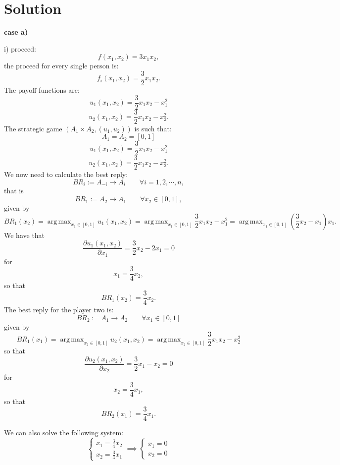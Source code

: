 \documentclass[a4paper, twoside, openany]{book}
\DeclareMathOperator*{\argmax}{arg\,max}
\begin{document}
\section*{Solution}
\textbf{case a)} \par
i) proceed:
$$f(x_1, x_2) = 3x_1 x_2,$$
the proceed for every single person is:
$$f_i(x_1, x_2) = \frac{3}{2} x_1 x_2.$$
The payoff functions are:
$$u_1(x_1, x_2) = \frac{3}{2}x_1 x_2 - x_1^2$$
$$u_2(x_1, x_2) = \frac{3}{2}x_1 x_2 - x_2^2.$$
The strategic game $(A_1 \times A_2, (u_1, u_2))$ is such that:
$$A_1 = A_2 = [0, 1]$$
$$u_1(x_1, x_2) = \frac{3}{2}x_1 x_2 - x_1^2$$
$$u_2(x_1, x_2) = \frac{3}{2}x_1 x_2 - x_2^2.$$
We now need to calculate the best reply:
$$BR_i:= A_{-i} \rightarrow A_i \qquad \forall i = 1, 2, \cdots, n,$$
that is
$$BR_1:= A_2 \rightarrow A_1 \qquad \forall x_2 \in [0, 1],$$
given by
$$BR_1(x_2) = \argmax_{x_1 \in [0,1]} u_1(x_1, x_2) = \argmax_{x_1 \in [0,1]} \frac{3}{2} x_1 x_2 - x_1^2 = \argmax_{x_1 \in [0, 1]} (\frac{3}{2}x_2 - x_1)x_1.$$
We have that
$$\frac{\partial u_1(x_1, x_2)}{\partial x_1} = \frac{3}{2}x_2 - 2 x_1 = 0$$
for
$$x_1 = \frac{3}{4}x_2,$$
so that
$$BR_1(x_2) = \frac{3}{4}x_2.$$
The best reply for the player two is:
$$BR_2:= A_1 \rightarrow A_2 \qquad \forall x_1 \in [0, 1]$$
given by
$$BR_1(x_1) = \argmax_{x_2 \in [0, 1]} u_2(x_1, x_2) = \argmax_{x_2 \in [0, 1]} \frac{3}{2}x_1 x_2 - x_2^2$$
so that
$$\frac{\partial u_2(x_1, x_2)}{\partial x_2} = \frac{3}{2}x_1 - x_2 = 0$$
for
$$x_2 = \frac{3}{4} x_1,$$
so that
$$BR_2(x_1) = \frac{3}{4}x_1.$$
\begin{figure}[!ht]
\begin{center}
\end{center}
\end{figure}
We can also solve the following system:
$$\begin{cases}
	x_1 = \frac{3}{4}x_2 \\
	x_2 = \frac{3}{4}x_1
   \end{cases} \implies
   \begin{cases}
   x_1 = 0 \\
   x_2 = 0
   \end{cases}$$
\end{document}

